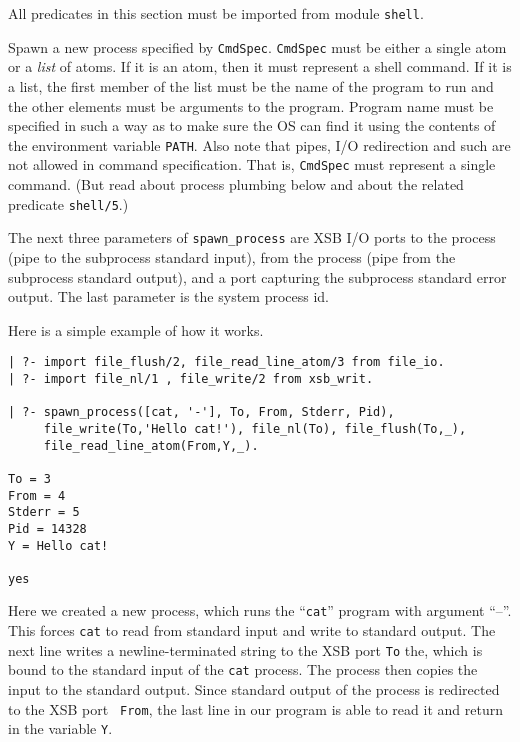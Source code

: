 All predicates in this section must be imported from module {\tt shell}.

\begin{description}
Spawn a new process specified by {\tt CmdSpec}. {\tt CmdSpec} must be
either a single atom or a \emph{list} of atoms.
If it is an atom, then it must represent a shell command.
If it is a list, the first member of the list must be the name of the
program to run and the 
other elements must be arguments to the program. Program name must be specified
in such a way as to make sure the OS can find it using the contents of the
environment variable {\tt PATH}.
Also note that pipes, I/O redirection and such are not allowed in command
specification. That is, {\tt CmdSpec} must represent a single command.
(But read about process plumbing below and about the related predicate
{\tt shell/5}.)

The next three parameters of \verb|spawn_process| are XSB I/O ports
to the process (pipe to the subprocess standard input), from the process
(pipe from the subprocess standard output), and a port capturing the
subprocess standard error output. The last parameter is the system process id.
\end{description}

\noindent
Here is a simple example of how it works.

\begin{verbatim}
| ?- import file_flush/2, file_read_line_atom/3 from file_io.
| ?- import file_nl/1 , file_write/2 from xsb_writ.  

| ?- spawn_process([cat, '-'], To, From, Stderr, Pid),
     file_write(To,'Hello cat!'), file_nl(To), file_flush(To,_),
     file_read_line_atom(From,Y,_).

To = 3
From = 4
Stderr = 5
Pid = 14328
Y = Hello cat!

yes
\end{verbatim}

Here we created a new process, which runs the ``{\tt cat}'' program
with argument ``--''. This forces {\tt cat} to read from standard input and
write to standard output. The next line writes a newline-terminated string
to the XSB port {\tt To} the, which is bound to the standard input of the
{\tt cat} process. The process then copies the input to the standard output.
Since standard output of the process is redirected to the XSB port {\tt
  From}, the last line in our program is able to read it and return in the
variable {\tt Y}.

